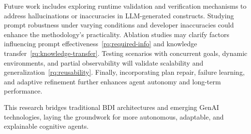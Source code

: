 \documentclass[12pt,a4paper,openright,twoside]{book}
\begin{document}

Future work includes exploring runtime validation and verification mechanisms
to address hallucinations or inaccuracies in \ac{LLM}-generated constructs.
%
Studying prompt robustness under varying conditions and developer inaccuracies
could enhance the methodology's practicality.
%
Ablation studies may clarify factors influencing prompt effectiveness~\ref{rq:required-info}
and knowledge transfer~\ref{rq:knowledge-transfer}.
%
Testing scenarios with concurrent goals, dynamic environments, and partial observability
will validate scalability and generalization~\ref{rq:reusability}.
%
Finally, incorporating plan repair, failure learning, and adaptive refinement further enhances agent autonomy and long-term performance.

This research bridges traditional \ac{BDI} architectures and emerging \ac{GenAI} technologies,
laying the groundwork for more autonomous, adaptable, and explainable cognitive agents.


\backmatter%
\printbibliography%
\end{document}
